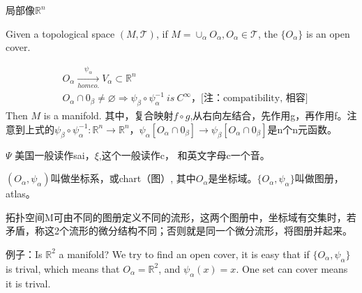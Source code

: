 局部像$\mathbb R ^n$


Given a topological space $(M, \mathscr T)$, if $M = \cup _ \alpha O_\alpha , O_\alpha \in \mathscr T$, the $\{ O_\alpha\}$ is an open cover.

\begin{displaymath}
  \begin{split}
    & O _\alpha \xrightarrow[homeo.]{\psi_\alpha } V_\alpha \subset \mathbb R^n \\
    & O_\alpha \cap 0_\beta \neq \varnothing \Longrightarrow \psi_\beta \circ \psi_\alpha ^ {-1} \ is \ C^ \infty \mbox{，[注：compatibility, 相容]}
  \end{split}
\end{displaymath}
Then $M$ is a manifold. 其中，复合映射$f \circ g$,从右向左结合，先作用g，再作用f。注意到上式的$\psi_\beta \circ \psi_\alpha ^ {-1}: \mathbb R^n \to \mathbb R^n$，$\psi_\alpha[O_\alpha \cap 0_\beta] \to \psi_\beta[O_\alpha \cap 0_\beta] $是n个n元函数。


$\Psi$ 美国一般读作sai，$\xi$,这个一般读作c， 和英文字母c一个音。

$( O_\alpha, \psi_\alpha)$叫做坐标系，或chart（图）, 其中$O_\alpha$是坐标域。$\{ O_\alpha, \psi_\alpha \}$叫做图册，atlas。

拓扑空间M可由不同的图册定义不同的流形，这两个图册中，坐标域有交集时，若矛盾，称这2个流形的微分结构不同；否则就是同一个微分流形，将图册并起来。

例子：Is $\mathbb R^2$ a manifold? We try to find an open cover, it is easy that  if $\{ O_\alpha, \psi_\alpha \}$ is trival, which means that $O_\alpha = \mathbb R^2$, and $\psi_\alpha (x) = x $. One set can cover means it is trival.

